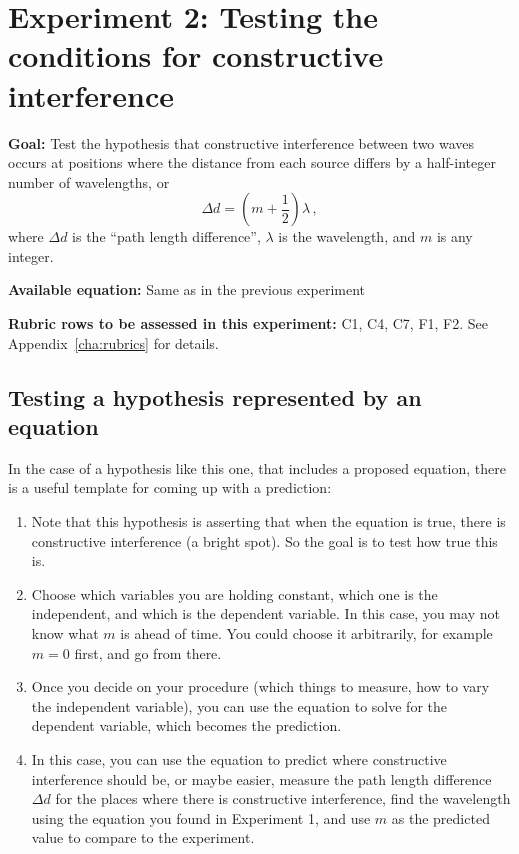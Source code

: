 \section{Experiment 2: Testing the conditions for constructive interference}

\textbf{Goal:} Test the hypothesis that constructive interference between two waves occurs at positions where the distance from each source differs by a half-integer number of wavelengths, or
\begin{equation}
 \Delta d = (m+\frac{1}{2})\lambda \,,
\end{equation}
where $\Delta d$ is the ``path length difference'', $\lambda$ is the wavelength, and $m$ is any integer.

\textbf{Available equation:} Same as in the previous experiment

\textbf{Rubric rows to be assessed in this experiment:} C1, C4, C7, F1, F2. See Appendix~\ref{cha:rubrics} for details.

\subsection{Testing a hypothesis represented by an equation}

In the case of a hypothesis like this one, that includes a proposed equation, there is a useful template for coming up with a prediction:
\begin{enumerate}
	\item Note that this hypothesis is asserting that when the equation is true, there is constructive interference (a bright spot). So the goal is to test how true this is.
	
	\item Choose which variables you are holding constant, which one is the independent, and which is the dependent variable. In this case, you may not know what $m$ is ahead of time. You could choose it arbitrarily, for example $m=0$ first, and go from there.
	
	\item Once you decide on your procedure (which things to measure, how to vary the independent variable), you can use the equation to solve for the dependent variable, which becomes the prediction.
	
	\item In this case, you can use the equation to predict where constructive interference should be, or maybe easier, measure the path length difference $\Delta d$ for the places where there is constructive interference, find the wavelength using the equation you found in Experiment 1, and use $m$ as the predicted value to compare to the experiment.
\end{enumerate}

